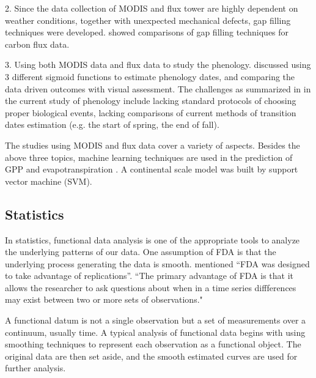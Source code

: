 \documentclass{article}
\begin{document}
2. Since the data collection of MODIS and flux tower are highly dependent on weather conditions, together with unexpected mechanical defects, gap filling techniques were  developed. \citet{moffat2007comprehensive} showed comparisons of gap filling techniques for carbon flux data.

3. Using both MODIS data and flux data to study the phenology. \citet{klosterman2014evaluating} discussed using 3 different sigmoid functions to estimate phenology dates, and comparing the data driven outcomes with visual assessment.  The challenges as summarized in \citet{klosterman2014evaluating} in the current study of phenology include lacking standard protocols of choosing proper biological events, lacking comparisons of current methods of transition dates estimation (e.g. the start of spring, the end of fall).

The studies using MODIS and flux data cover a variety of aspects. Besides the above three topics, machine learning techniques are used in the prediction of GPP \citep{yang2007developing} and evapotranspiration \citep{yang2006prediction}.  A continental scale model was built by support vector machine (SVM).   


\subsection{Statistics}

In statistics, functional data analysis is one of the appropriate tools to analyze the underlying patterns of our data. 
One assumption of FDA is that the underlying process generating the data is smooth.
\citet{levitin2007introduction} mentioned ``FDA was designed to take advantage of replications''.
``The primary advantage of FDA is that it allows the researcher to ask questions about when in a time series diffferences may exist between two or more sets of observations." \citep{levitin2007introduction}

A functional datum is not a single observation but a set of measurements over a continuum, usually time.
A typical analysis of functional data begins with using smoothing techniques to represent each observation as a functional object. The original data are then set aside, and the smooth estimated curves are used for further analysis. 
\end{document}
